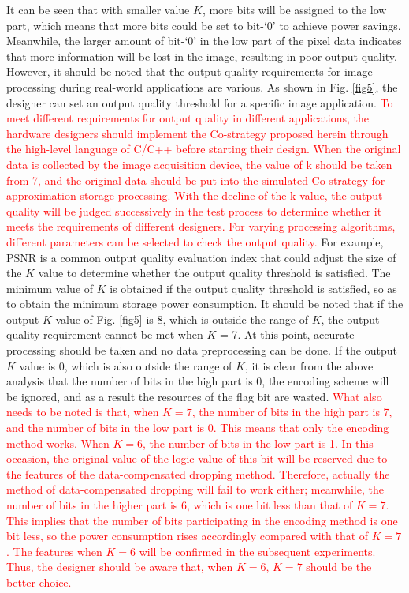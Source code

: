 \documentclass[lettersize,journal]{IEEEtran}
\begin{document}
It can be seen that with smaller value $K$, more bits will be assigned to the low part, which means that more bits could be set to bit-`0' to achieve power savings. Meanwhile, the larger amount of bit-`0' in the low part of the pixel data indicates that more information will be lost in the image, resulting in poor output quality. However, it should be noted that the output quality requirements for image processing during real-world applications are various. As shown in Fig. \ref{fig5}, the designer can set an output quality threshold for a specific image application. 
\textcolor{red}{To meet different requirements for output quality in different applications, the hardware designers should implement the Co-strategy proposed herein through the high-level language of C/C++ before starting their design. When the original data is collected by the image acquisition device, the value of k should be taken from 7, and the original data should be put into the simulated Co-strategy for approximation storage processing. With the decline of the k value, the output quality will be judged successively in the test process to determine whether it meets the requirements of different designers. For varying processing algorithms, different parameters can be selected to check the output quality. }
For example, PSNR is a common output quality evaluation index that could adjust the size of the $K$ value to determine whether the output quality threshold is satisfied. The minimum value of $K$ is obtained if the output quality threshold is satisfied, so as to obtain the minimum storage power consumption. It should be noted that if the output $K$ value of Fig. \ref{fig5} is 8, which is outside the range of $K$, the output quality requirement cannot be met when $K$ = 7. At this point, accurate processing should be taken and no data preprocessing can be done. If the output $K$ value is 0, which is also outside the range of $K$, it is clear from the above analysis that the number of bits in the high part is 0, the encoding scheme will be ignored, and as a result the resources of the flag bit are wasted.
\textcolor{red}{What also needs to be noted is that, when $K=7$, the number of bits in the high part is 7, and the number of bits in the low part is 0. This means that only the encoding method works. When $K=6$, the number of bits in the low part is 1. In this occasion, the original value of the logic value of this bit will be reserved due to the features of the data-compensated dropping method. Therefore, actually the method of data-compensated dropping will fail to work either; meanwhile, the number of bits in the higher part is 6, which is one bit less than that of $K=7$. This implies that the number of bits participating in the encoding method is one bit less, so the power consumption rises accordingly compared with that of $K=7$. The features when $K=6$ will be confirmed in the subsequent experiments. Thus, the designer should be aware that, when $K=6$, $K=7$ should be the better choice.}
\end{document}
